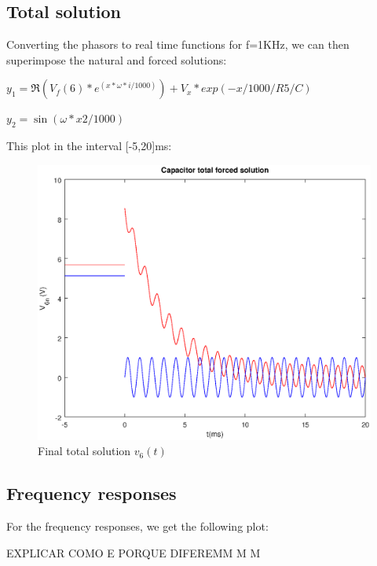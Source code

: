   

\subsection{Total solution}

Converting the phasors to real time functions for f=1KHz, we can then superimpose the natural and forced solutions:

$y_1=\Re(V_f(6)*e^(x*\omega*i/1000))+V_x*exp(-x/1000/R5/C)$

$y_2=\sin(\omega*x2/1000)$



  This plot in the interval [-5,20]ms:

  \begin{figure}[H] \centering
    \includegraphics[width=1\linewidth]{forced.eps}
    \caption{Final total solution $v_{6}(t)$}
    \label{fig:total}
    \end{figure}
    
\subsection{Frequency responses}
      
  For the frequency responses, we get the following plot:
  
  
  EXPLICAR COMO E PORQUE DIFEREMM
  M
  M
